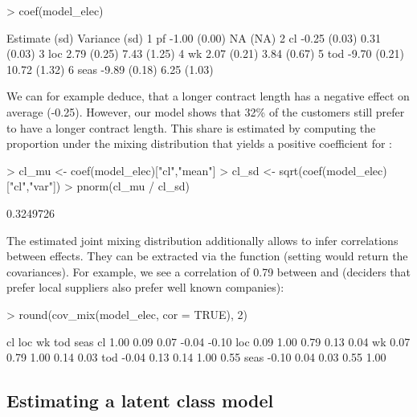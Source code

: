 \documentclass[article,shortnames]{jss}
\newcommand{\fct}[1]{\code{#1()}}
\begin{document}
\begin{Schunk}
\begin{Sinput}
> coef(model_elec)
\end{Sinput}
\begin{Soutput}
        Estimate   (sd) Variance   (sd)
1   pf     -1.00 (0.00)       NA   (NA)
2   cl     -0.25 (0.03)     0.31 (0.03)
3  loc      2.79 (0.25)     7.43 (1.25)
4   wk      2.07 (0.21)     3.84 (0.67)
5  tod     -9.70 (0.21)    10.72 (1.32)
6 seas     -9.89 (0.18)     6.25 (1.03)
\end{Soutput}
\end{Schunk}

We can for example deduce, that a longer contract length has a negative effect on average (-0.25). However, our model shows that 32\% of the customers still prefer to have a longer contract length. This share is estimated by computing the proportion under the mixing distribution that yields a positive coefficient for :

\begin{Schunk}
\begin{Sinput}
> cl_mu <- coef(model_elec)["cl","mean"]
> cl_sd <- sqrt(coef(model_elec)["cl","var"])
> pnorm(cl_mu / cl_sd)
\end{Sinput}
\begin{Soutput}
[1] 0.3249726
\end{Soutput}
\end{Schunk}

The estimated joint mixing distribution additionally allows to infer correlations between effects. They can be extracted via the \fct{cov\_mix} function (setting  would return the covariances). For example, we see a correlation of 0.79 between  and  (deciders that prefer local suppliers also prefer well known companies):

\begin{Schunk}
\begin{Sinput}
> round(cov_mix(model_elec, cor = TRUE), 2)
\end{Sinput}
\begin{Soutput}
        cl  loc   wk   tod  seas
cl    1.00 0.09 0.07 -0.04 -0.10
loc   0.09 1.00 0.79  0.13  0.04
wk    0.07 0.79 1.00  0.14  0.03
tod  -0.04 0.13 0.14  1.00  0.55
seas -0.10 0.04 0.03  0.55  1.00
\end{Soutput}
\end{Schunk}

\subsection{Estimating a latent class model} \label{subsec:latent_classes}
\end{document}
